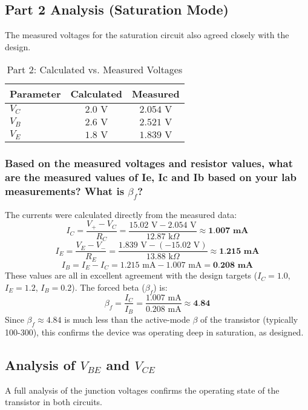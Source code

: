 \subsection*{Part 2 Analysis (Saturation Mode)}
The measured voltages for the saturation circuit also agreed closely with the design.
\begin{table}[H]
\centering
\caption{Part 2: Calculated vs. Measured Voltages}
\begin{tabular}{|l|c|c|}
\hline
\textbf{Parameter} & \textbf{Calculated} & \textbf{Measured} \\ \hline
\textbf{$V_C$} & $2.0 \text{ V}$ & $2.054 \text{ V}$ \\ \hline
\textbf{$V_B$} & $2.6 \text{ V}$ & $2.521 \text{ V}$ \\ \hline
\textbf{$V_E$} & $1.8 \text{ V}$ & $1.839 \text{ V}$ \\ \hline
\end{tabular}
\end{table}

\subsubsection*{Based on the measured voltages and resistor values, what are the measured values of Ie, Ic and Ib based on your lab measurements? What is $\beta_f$?}
The currents were calculated directly from the measured data:
\[ I_C = \frac{V_+ - V_C}{R_C} = \frac{15.02 \text{ V} - 2.054 \text{ V}}{12.87 \text{ k}\Omega} \approx \textbf{1.007 mA} \]
\[ I_E = \frac{V_E - V_-}{R_E} = \frac{1.839 \text{ V} - (-15.02 \text{ V})}{13.88 \text{ k}\Omega} \approx \textbf{1.215 mA} \]
\[ I_B = I_E - I_C = 1.215 \text{ mA} - 1.007 \text{ mA} = \textbf{0.208 mA} \]
These values are all in excellent agreement with the design targets ($I_C=1.0$, $I_E=1.2$, $I_B=0.2$). The forced beta ($\beta_f$) is:
\[ \beta_{f} = \frac{I_C}{I_B} = \frac{1.007 \text{ mA}}{0.208 \text{ mA}} \approx \textbf{4.84} \]
Since $\beta_{f} \approx 4.84$ is much less than the active-mode $\beta$ of the transistor (typically 100-300), this confirms the device was operating deep in saturation, as designed.

\subsection*{Analysis of $V_{BE}$ and $V_{CE}$}
A full analysis of the junction voltages confirms the operating state of the transistor in both circuits.

